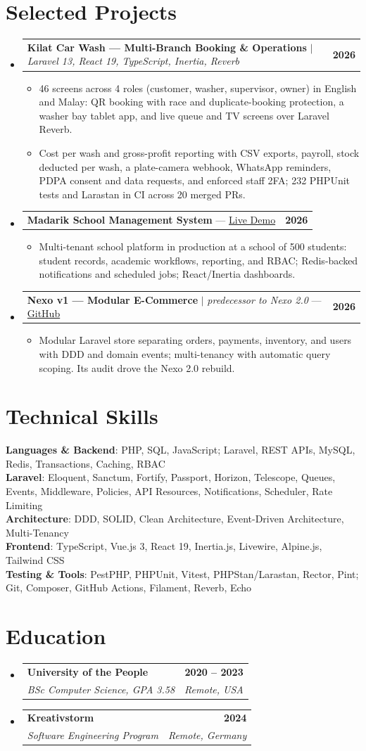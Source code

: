 \documentclass[letterpaper,10pt]{article}
\makeatletter
\newcommand{\resumeItem}[1]{\item\small{{#1 \vspace{-2pt}}}}
\newcommand{\resumeSubheading}[4]{
  \vspace{-2pt}\item
    \begin{tabular*}{0.97\textwidth}[t]{l@{\extracolsep{\fill}}r}
      \textbf{#1} & \textbf{\small #2} \\
      \textit{\small#3} & \textit{\small #4} \\
    \end{tabular*}\vspace{-7pt}
}
\newcommand{\resumeProjectHeading}[2]{
    \item
    \begin{tabular*}{0.97\textwidth}{l@{\extracolsep{\fill}}r}
      \small#1 & \textbf{\small #2} \\
    \end{tabular*}\vspace{-7pt}
}
\newcommand{\resumeSubHeadingListStart}{\begin{itemize}[leftmargin=0.15in, label={}]}
\newcommand{\resumeSubHeadingListEnd}{\end{itemize}}
\newcommand{\resumeItemListStart}{\begin{itemize}[label=--]}
\newcommand{\resumeItemListEnd}{\end{itemize}\vspace{-5pt}}
\makeatother
\begin{document}
\section{Selected Projects}
  \resumeSubHeadingListStart
    \resumeProjectHeading
      {\textbf{Kilat Car Wash --- Multi-Branch Booking \& Operations} $|$ \emph{Laravel 13, React 19, TypeScript, Inertia, Reverb}}{2026}
      \resumeItemListStart
        \resumeItem{46 screens across 4 roles (customer, washer, supervisor, owner) in English and Malay: QR booking with race and duplicate-booking protection, a washer bay tablet app, and live queue and TV screens over Laravel Reverb.}
        \resumeItem{Cost per wash and gross-profit reporting with CSV exports, payroll, stock deducted per wash, a plate-camera webhook, WhatsApp reminders, PDPA consent and data requests, and enforced staff 2FA; 232 PHPUnit tests and Larastan in CI across 20 merged PRs.}
      \resumeItemListEnd
    \resumeProjectHeading
      {\textbf{Madarik School Management System} --- \href{https://madarik.aljebal-albeedos.com}{Live Demo}}{2026}
      \resumeItemListStart
        \resumeItem{Multi-tenant school platform in production at a school of 500 students: student records, academic workflows, reporting, and RBAC; Redis-backed notifications and scheduled jobs; React/Inertia dashboards.}
      \resumeItemListEnd
    \resumeProjectHeading
      {\textbf{Nexo v1 --- Modular E-Commerce} $|$ \emph{predecessor to Nexo 2.0} --- \href{https://github.com/AdilAzhariOmsan/nexo-ecommerce}{GitHub}}{2026}
      \resumeItemListStart
        \resumeItem{Modular Laravel store separating orders, payments, inventory, and users with DDD and domain events; multi-tenancy with automatic query scoping. Its audit drove the Nexo 2.0 rebuild.}
      \resumeItemListEnd
  \resumeSubHeadingListEnd

\section{Technical Skills}
 \begin{itemize}[leftmargin=0.15in, label={}]
    \small{\item{
     \textbf{Languages \& Backend}{: PHP, SQL, JavaScript; Laravel, REST APIs, MySQL, Redis, Transactions, Caching, RBAC} \\
     \textbf{Laravel}{: Eloquent, Sanctum, Fortify, Passport, Horizon, Telescope, Queues, Events, Middleware, Policies, API Resources, Notifications, Scheduler, Rate Limiting} \\
     \textbf{Architecture}{: DDD, SOLID, Clean Architecture, Event-Driven Architecture, Multi-Tenancy} \\
     \textbf{Frontend}{: TypeScript, Vue.js 3, React 19, Inertia.js, Livewire, Alpine.js, Tailwind CSS} \\
     \textbf{Testing \& Tools}{: PestPHP, PHPUnit, Vitest, PHPStan/Larastan, Rector, Pint; Git, Composer, GitHub Actions, Filament, Reverb, Echo}
    }}
 \end{itemize}

\section{Education}
  \resumeSubHeadingListStart
    \resumeSubheading
      {University of the People}{2020 -- 2023}
      {BSc Computer Science, GPA 3.58}{Remote, USA}
    \resumeSubheading
      {Kreativstorm}{2024}
      {Software Engineering Program}{Remote, Germany}
  \resumeSubHeadingListEnd
\end{document}
